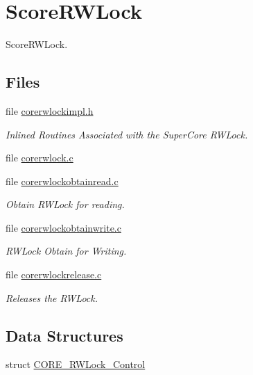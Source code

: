 \hypertarget{group__RTEMSScoreRWLock}{}\section{Score\+R\+W\+Lock}
\label{group__RTEMSScoreRWLock}


Score\+R\+W\+Lock.  


\subsection*{Files}
\begin{DoxyCompactItemize}
\item 
file \mbox{\hyperlink{corerwlockimpl_8h}{corerwlockimpl.\+h}}
\begin{DoxyCompactList}\small\item\em Inlined Routines Associated with the Super\+Core R\+W\+Lock. \end{DoxyCompactList}\item 
file \mbox{\hyperlink{corerwlock_8c}{corerwlock.\+c}}
\item 
file \mbox{\hyperlink{corerwlockobtainread_8c}{corerwlockobtainread.\+c}}
\begin{DoxyCompactList}\small\item\em Obtain R\+W\+Lock for reading. \end{DoxyCompactList}\item 
file \mbox{\hyperlink{corerwlockobtainwrite_8c}{corerwlockobtainwrite.\+c}}
\begin{DoxyCompactList}\small\item\em R\+W\+Lock Obtain for Writing. \end{DoxyCompactList}\item 
file \mbox{\hyperlink{corerwlockrelease_8c}{corerwlockrelease.\+c}}
\begin{DoxyCompactList}\small\item\em Releases the R\+W\+Lock. \end{DoxyCompactList}\end{DoxyCompactItemize}
\subsection*{Data Structures}
\begin{DoxyCompactItemize}
\item 
struct \mbox{\hyperlink{structCORE__RWLock__Control}{C\+O\+R\+E\+\_\+\+R\+W\+Lock\+\_\+\+Control}}
\end{DoxyCompactItemize}

